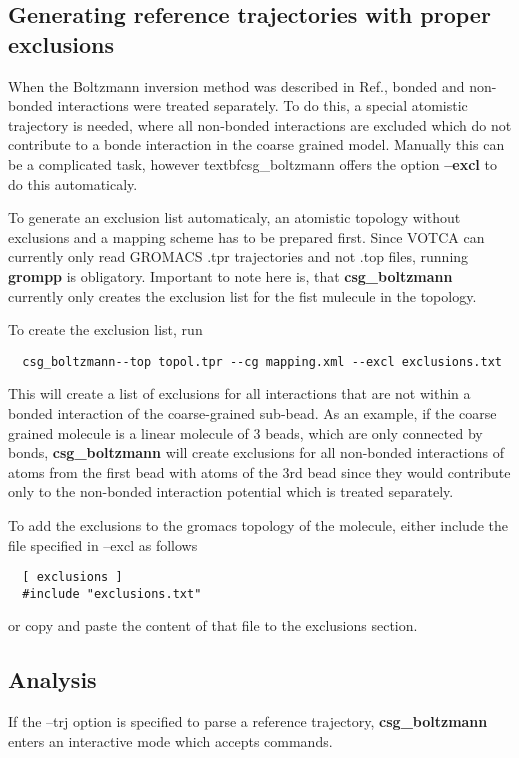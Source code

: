 \subsection{Generating reference trajectories with proper exclusions}
When the Boltzmann inversion method was described in Ref.\cite{Tschoep:1998}, bonded and non-bonded interactions were treated separately. To do this, a special atomistic trajectory is needed, where all non-bonded interactions are excluded which do not contribute to a bonde interaction in the coarse grained model. Manually this can be a complicated task, however textbf{csg\_boltzmann} offers the option \textbf{--excl} to do this automaticaly.

To generate an exclusion list automaticaly, an atomistic topology without exclusions and a mapping scheme has to be prepared first. Since VOTCA can currently only read GROMACS .tpr trajectories and not .top files, running \textbf{grompp} is obligatory. Important to note here is, that \textbf{csg\_boltzmann} currently only creates the exclusion list for the fist mulecule in the topology.

To create the exclusion list, run
\begin{verbatim}
  csg_boltzmann--top topol.tpr --cg mapping.xml --excl exclusions.txt
\end{verbatim}
This will create a list of exclusions for all interactions that are not within a bonded interaction of the coarse-grained sub-bead. As an example, if the coarse grained molecule is a linear molecule of 3 beads, which are only connected by bonds, \textbf{csg\_boltzmann} will create exclusions for all non-bonded interactions of atoms from the first bead with atoms of the 3rd bead since they would contribute only to the non-bonded interaction potential which is treated separately.

To add the exclusions to the gromacs topology of the molecule, either include the file specified in --excl as follows
\begin{verbatim}
  [ exclusions ]
  #include "exclusions.txt"
\end{verbatim}
or copy and paste the content of that file to the exclusions section.


\subsection{Analysis}
If the --trj option is specified to parse a reference trajectory, \textbf{csg\_boltzmann} enters an interactive mode which accepts commands.

